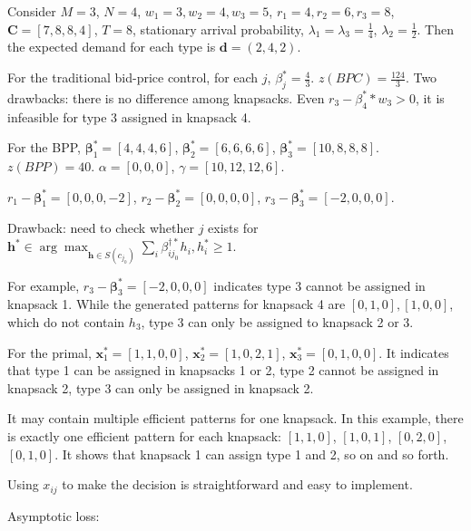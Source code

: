 \begin{example}
Consider $M =3$, $N =4$, $w_{1} = 3, w_{2} = 4, w_{3} = 5$, $r_{1} = 4, r_{2} = 6, r_{3} = 8$, $\bm{C} = [7, 8, 8, 4]$, $T = 8$, stationary arrival probability, $\lambda_{1} = \lambda_{3} = \frac{1}{4}$, $\lambda_{2} = \frac{1}{2}$. Then the expected demand for each type is $\bm{d} = (2, 4, 2)$.

For the traditional bid-price control, for each $j$, $\beta_{j}^{*} = \frac{4}{3}$. $z(BPC) = \frac{124}{3}$. Two drawbacks: there is no difference among knapsacks. Even $r_{3} - \beta_{4}^{*} * w_{3} > 0$, it is infeasible for type 3 assigned in knapsack 4.

For the BPP, $\bm{\beta}_{1}^{*} = [4, 4, 4, 6]$, $\bm{\beta}_{2}^{*} = [6, 6, 6, 6]$, $\bm{\beta}_{3}^{*} = [10, 8, 8, 8]$. $z(BPP) = 40$. $\alpha = [0, 0, 0]$, $\gamma = [10, 12, 12, 6]$.

$r_{1} - \bm{\beta}_{1}^{*} = [0, 0, 0, -2]$, $r_{2} - \bm{\beta}_{2}^{*} = [0, 0, 0, 0]$, $r_{3} - \bm{\beta}_{3}^{*} = [-2, 0, 0, 0]$.

Drawback: need to check whether $j$ exists for $\bm{h}^{*} \in \arg\max_{\bm{h} \in S(c_{j_0})} \sum_{i} \beta_{ij_0}^{\dag *} h_{i}, h_{i}^{*} \geq 1$.

For example, $r_{3} - \bm{\beta}_{3}^{*} = [-2, 0, 0, 0]$ indicates type 3 cannot be assigned in knapsack 1. While the generated patterns for knapsack 4 are $[0, 1, 0], [1, 0, 0]$, which do not contain $h_{3}$, type 3 can only be assigned to knapsack 2 or 3.


For the primal, $\bm{x}_{1}^{*} = [1, 1, 0, 0]$, $\bm{x}_{2}^{*} = [1, 0, 2, 1]$, $\bm{x}_{3}^{*} = [0, 1, 0, 0]$. It indicates that type 1 can be assigned in knapsacks 1 or 2, type 2 cannot be assigned in knapsack 2, type 3 can only be assigned in knapsack 2. 

It may contain multiple efficient patterns for one knapsack. In this example, there is exactly one efficient pattern for each knapsack: $[1, 1, 0]$, $[1, 0, 1]$, $[0, 2, 0]$, $[0, 1, 0]$. It shows that knapsack 1 can assign type 1 and 2, so on and so forth.

Using $x_{ij}$ to make the decision is straightforward and easy to implement.
\end{example}


Asymptotic loss:

